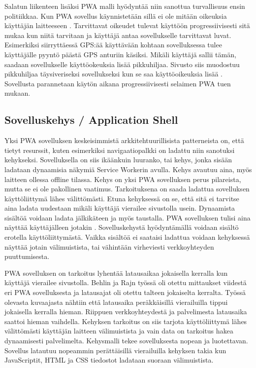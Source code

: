 \documentclass{tktltiki}
\begin{document}
Salatun liikenteen lisäksi PWA malli hyödyntää niin sanottua turvallisuus ensin politiikkaa. Kun PWA sovellus käynnistetään sillä ei ole mitään oikeuksia käyttäjän laitteeseen \cite{8287006}. Tarvittavat oikeudet tulevat käyttöön progressiivisesti sitä mukaa kun niitä tarvitaan ja käyttäjä antaa sovellukselle tarvittavat luvat. Esimerkiksi siirryttäessä GPS:ää käyttävään kohtaan sovelluksessa tulee käyttäjälle pyyntö päästä GPS anturiin käsiksi. Mikäli käyttäjä sallii tämän, saadaan sovellukselle käyttöokeuksia lisää pikkuhiljaa. Sivusto siis muodostuu pikkuhiljaa täysiveriseksi sovellukseksi kun se saa käyttöoikeuksia lisää \cite{von2018progressive}. Sovellusta parannetaan käytön aikana progressiivisesti selaimen PWA tuen mukaan.

\subsection{Sovelluskehys / Application Shell}

Yksi PWA sovelluksen keskeisimmistä arkkitehtuurillisista patterneista on, että tietyt resurssit, kuten esimerkiksi navigaatiopalkki on ladattu niin sanotuksi kehykseksi. \cite{8441701} Sovelluksella on siis ikäänkuin luuranko, tai kehys, jonka sisään ladataan dynaamisia näkymiä Service Workerin avulla. Kehys avautuu aina, myös laitteen ollessa offline tilassa. Kehys on yksi PWA sovelluksen perus pilareista, mutta se ei ole pakollinen vaatimus. Tarkoituksena on saada ladattua sovelluksen käyttöliittymä lähes välittömästi. Etuna kehyksessä on se, että sitä ei tarvitse aina ladata uudestaan mikäli käyttäjä vierailee sivustolla usein. Dynaamista sisältöä voidaan ladata jälkikäteen ja myös taustalla. PWA sovelluksen tulisi aina näyttää käyttäjälleen jotakin \cite{von2018progressive}. Sovelluskehystä hyödyntämällä voidaan sisältö erotella käyttöliittymästä. Vaikka sisältöä ei saataisi ladattua voidaan kehyksessä näyttää jotain välimuistista, tai vähintään virheviesti verkkoyhteyden puuttumisesta.

PWA sovelluksen on tarkoitus lyhentää latausaikaa jokaisella kerralla kun käyttäjä vierailee sivustolla. Behlin ja Rajn työssä \cite{8441701} oli otettu mittaukset viidestä eri PWA sovelluksesta ja latausajat oli otettu talteen jokaiselta kerralta. Työssä olevasta kuvaajasta nähtiin että latausaika peräkkäisillä vierailuilla tippui jokaisella kerralla hieman. Riippuen verkkoyhteydestä ja palvelimesta latausaika saattoi hieman vaihdella. Kehyksen tarkoitus on siis tarjota käyttöliittymä lähes välittömästi käyttäjän laitteen välimuistista ja vain data on tarkoitus hakea dynaamisesti palvelimelta. Kehysmalli tekee sovelluksesta nopean ja luotettavan. Sovellus latautuu nopeammin perättäisillä vierailuilla kehyksen takia kun JavaScriptit, HTML ja CSS tiedostot ladataan suoraan välimuistista.
\end{document}
